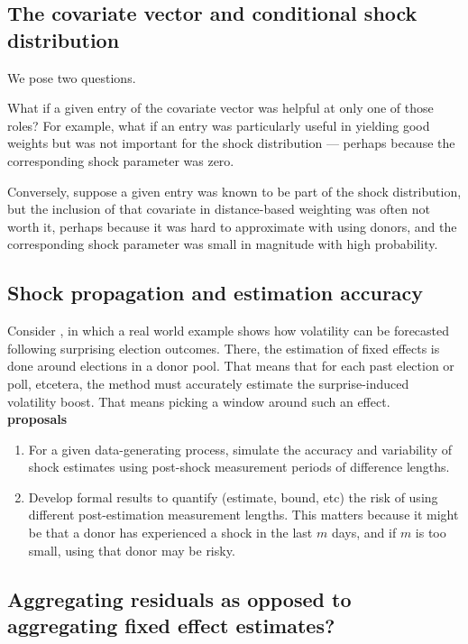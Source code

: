 \documentclass{uiucthesis2021}
\theoremstyle{definition}
\begin{document}
  \subsection{The covariate vector and conditional shock distribution}
  We pose two questions.  
  
  What if a given entry of the covariate vector was helpful at only one of those roles?  For example, what if an entry was particularly useful in yielding good weights but was not important for the shock distribution --- perhaps because the corresponding shock parameter was zero.  
  
  Conversely, suppose a given entry was known to be part of the shock distribution, but the inclusion of that covariate in distance-based weighting was often not worth it, perhaps because it was hard to approximate with using donors, and the corresponding shock parameter was small in magnitude with high probability.
  
  \subsection{Shock propagation and estimation accuracy}
  Consider \cite[][]{lundquist2024volatility}, in which a real world example shows how volatility can be forecasted following surprising election outcomes.  There, the estimation of fixed effects is done around elections in a donor pool.  That means that for each past election or poll, etcetera, the method must accurately estimate the surprise-induced volatility boost.  That means picking a window around such an effect.\\
  
  \textbf{proposals}
  \begin{enumerate}
    \item For a given data-generating process, simulate the accuracy and variability of shock estimates using post-shock measurement periods of difference lengths.
    \item Develop formal results to quantify (estimate, bound, etc) the risk of using different post-estimation measurement lengths.  This matters because it might be that a donor has experienced a shock in the last $m$ days, and if $m$ is too small, using that donor may be risky.
  \end{enumerate}
      
  \subsection{Aggregating residuals as opposed to aggregating fixed effect estimates?}
  
\end{document}
